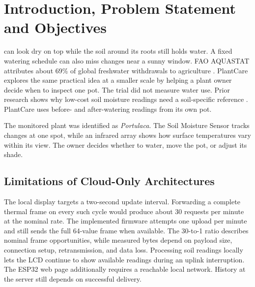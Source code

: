 \documentclass{ieeeaccess}
\begin{document}
\section{Introduction, Problem Statement and Objectives}
 can look dry on top while the soil around its roots still holds water. A fixed watering schedule can also miss changes near a sunny window. FAO AQUASTAT attributes about 69\% of global freshwater withdrawals to agriculture \cite{fao}. PlantCare explores the same practical idea at a smaller scale by helping a plant owner decide when to inspect one pot. The trial did not measure water use. Prior research shows why low-cost soil moisture readings need a soil-specific reference \cite{calibration}. PlantCare uses before- and after-watering readings from its own pot.

The monitored plant was identified as \textit{Portulaca}. The Soil Moisture Sensor tracks changes at one spot, while an infrared array shows how surface temperatures vary within its view. The owner decides whether to water, move the pot, or adjust its shade.

\subsection{Limitations of Cloud-Only Architectures}
The local display targets a two-second update interval. Forwarding a complete thermal frame on every such cycle would produce about 30 requests per minute at the nominal rate. The implemented firmware attempts one upload per minute and still sends the full 64-value frame when available. The 30-to-1 ratio describes nominal frame opportunities, while measured bytes depend on payload size, connection setup, retransmission, and data loss. Processing soil readings locally lets the LCD continue to show available readings during an uplink interruption. The ESP32 web page additionally requires a reachable local network. History at the server still depends on successful delivery.
\end{document}

